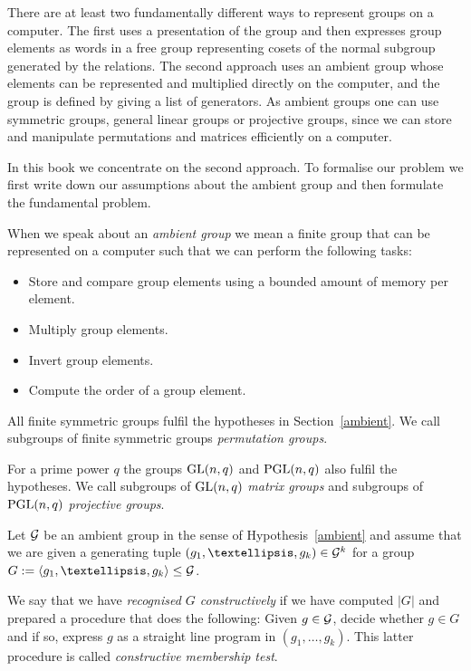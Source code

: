 %
There are at least two fundamentally different ways to represent groups on
a computer. The first uses a presentation of the group and then
expresses group elements as words in a free group representing
cosets of the normal subgroup generated by the relations. The second
approach uses an ambient group whose elements can be represented and
multiplied directly on the computer, and the group is defined by giving
a list of generators. As ambient groups one can use symmetric groups, general
linear groups or projective groups, since we can store and manipulate
permutations and matrices efficiently on a computer.

In this book we concentrate on the second approach. To formalise our
problem we first write down our assumptions about the ambient group
and then formulate the fundamental problem.

\begin{Hyp}
\label{ambient}
%
When we speak about an \emph{ambient group} we mean a finite group that can
be represented on a computer such that we can perform the following tasks:
\begin{itemize}
\item Store and compare group elements using a bounded amount of memory
per element.
\item Multiply group elements.
\item Invert group elements.
\item Compute the order of a group element.
\end{itemize}
\end{Hyp}

\begin{Rem}
All finite symmetric groups fulfil the hypotheses in Section~\ref{ambient}.
We call subgroups of finite symmetric groups \emph{permutation groups}.
%

For a prime power $q$ the groups $\GL(n,q)$ and $\PGL(n,q)$ also fulfil
the hypotheses. We call subgroups of $\GL(n,q)$ \emph{matrix groups}
and subgroups of $\PGL(n,q)$ \emph{projective groups}.
%
\end{Rem}

\begin{Problem}
\label{ProbCR1}%
Let $\mathcal{G}$ be an ambient group in the sense of Hypothesis~\ref{ambient} and 
assume that we are given a generating tuple $(g_1, \ldots, g_k) \in
\GG^k$ for a group
$G := \left< g_1, \ldots, g_k \right> \le \GG$. 

We say that we have \emph{recognised $G$ constructively} if we have 
computed $|G|$ and
prepared a procedure that does the following: Given $g \in \mathcal{G}$,
decide whether $g \in G$ and if so, express $g$ as a straight line program
in $(g_1, \ldots, g_k)$. This latter procedure is called \emph{constructive
membership test}.
\proofend
\end{Problem}

